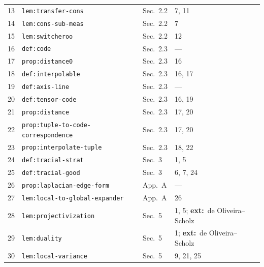 \documentclass{article}
\theoremstyle{remark}
\begin{document}
\begin{longtable}{L{0.04\textwidth}L{0.32\textwidth}L{0.28\textwidth}L{0.26\textwidth}}
	13 & \texttt{lem:transfer-cons}                 & Sec.~2.2       & 7, 11                                   \\
	14 & \texttt{lem:cons-sub-meas}                 & Sec.~2.2       & 7                                       \\
	15 & \texttt{lem:switcheroo}                    & Sec.~2.2       & 12                                      \\
	16 & \texttt{def:code}                          & Sec.~2.3       & ---                                     \\
	17 & \texttt{prop:distance0}                    & Sec.~2.3       & 16                                      \\
	18 & \texttt{def:interpolable}                  & Sec.~2.3       & 16, 17                                  \\
	19 & \texttt{def:axis-line}                     & Sec.~2.3       & ---                                     \\
	20 & \texttt{def:tensor-code}                   & Sec.~2.3       & 16, 19                                  \\
	21 & \texttt{prop:distance}                     & Sec.~2.3       & 17, 20                                  \\
	22 & \texttt{prop:tuple-to-code-correspondence} & Sec.~2.3       & 17, 20                                  \\
	23 & \texttt{prop:interpolate-tuple}            & Sec.~2.3       & 18, 22                                  \\
	24 & \texttt{def:tracial-strat}                 & Sec.~3         & 1, 5                                    \\
	25 & \texttt{def:tracial-good}                  & Sec.~3         & 6, 7, 24                                \\
	26 & \texttt{prop:laplacian-edge-form}          & App.~A         & ---                                     \\
	27 & \texttt{lem:local-to-global-expander}      & App.~A         & 26                                      \\
	28 & \texttt{lem:projectivization}              & Sec.~5         & 1, 5; \textbf{ext:}~de Oliveira--Scholz \\
	29 & \texttt{lem:duality}                       & Sec.~5         & 1; \textbf{ext:}~de Oliveira--Scholz    \\
	30 & \texttt{lem:local-variance}                & Sec.~5         & 9, 21, 25                               \\

\end{longtable}
\end{document}
